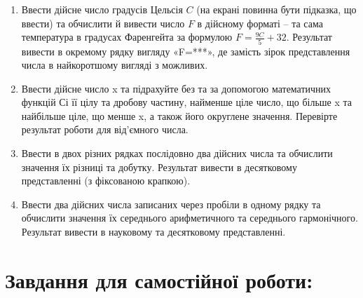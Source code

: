 \documentclass[a5paper,titlepage,openany,twoside,draft]{book_unv}%
\begin{document}
\begin{enumerate}
\item
  Ввести дійсне число градусів Цельсія $C$ (на екрані повинна бути
  підказка, що ввести) та обчислити й вивести число $F$ в дійсному форматі
  -- та сама температура в градусах Фаренгейта за формулою $F = \frac{9C}{5} + 32 $.
 Результат вивести в окремому рядку вигляду «F=***», де замість зірок представлення числа в найкоротшому вигляді
  з можливих.

\item
  Ввести дійсне число x та підрахуйте без та за допомогою математичних
  функцій Сі її цілу та дробову частину, найменше ціле число, що більше
  x та найбільше ціле, що менше x, а також його округлене значення.
  Перевірте результат роботи для від'ємного числа.
\item
  Ввести в двох різних рядках послідовно два дійсних числа та обчислити
  значення їх різниці та добутку. Результат вивести в десятковому
  представленні (з фіксованою крапкою).
\item
  Ввести два дійсних числа записаних через пробіли в одному рядку та
  обчислити значення їх середнього арифметичного та середнього
  гармонічного. Результат вивести в науковому та десятковому
  представленні.
\end{enumerate}

\section{Завдання для самостійної роботи:}
\end{document}
